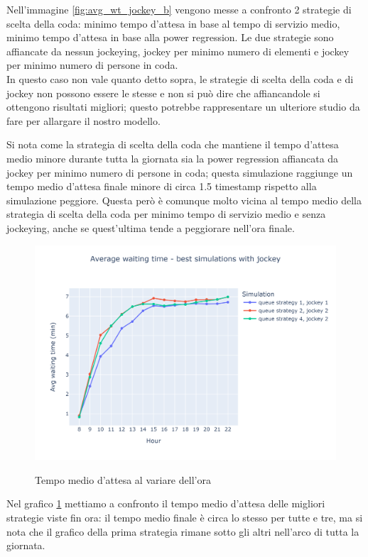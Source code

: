 Nell'immagine \ref{fig:avg_wt_jockey_b} vengono messe a confronto 2 strategie di scelta della coda: minimo tempo d'attesa in base al tempo di servizio medio, minimo tempo d'attesa in base alla power regression. Le due strategie sono affiancate da nessun jockeying, jockey per minimo numero di elementi e jockey per minimo numero di persone in coda. \\
In questo caso non vale quanto detto sopra, le strategie di scelta della coda e di jockey non possono essere le stesse e non si può dire che affiancandole si ottengono risultati migliori; questo potrebbe rappresentare un ulteriore studio da fare per allargare il nostro modello.

Si nota come la strategia di scelta della coda che mantiene il tempo
d'attesa medio minore durante tutta la giornata sia la power
regression affiancata da jockey per minimo numero di persone in coda;
questa simulazione raggiunge un tempo medio d'attesa finale minore di
circa 1.5 timestamp rispetto alla simulazione peggiore. Questa però è
comunque molto vicina al tempo medio della strategia di scelta della
coda per minimo tempo di servizio medio e senza jockeying, anche se
quest'ultima tende a peggiorare nell'ora finale.

\begin{figure}[H]
	\centering
	\includegraphics[width=12cm]{"images/results/avg_wt_jockey_best.png"}
	\label{fig:avg_wt_jockey_best}
	\caption{Tempo medio d'attesa al variare dell'ora}
\end{figure}

Nel grafico \ref{fig:avg_wt_jockey_best} mettiamo a confronto il tempo medio d'attesa delle migliori strategie viste fin ora: il tempo medio finale è circa lo stesso per tutte e tre, ma si nota che il grafico della prima strategia rimane sotto gli altri nell'arco di tutta la giornata.

